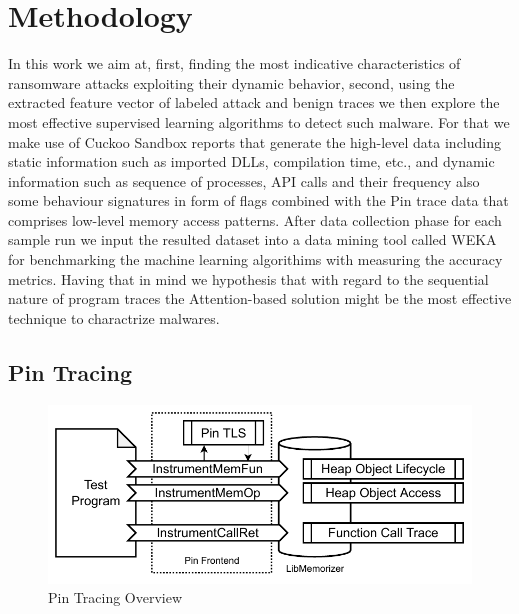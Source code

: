 \documentclass[letterpaper,twocolumn,10pt]{article}
\begin{document}
\section{Methodology}

In this work we aim at, first, finding the most indicative characteristics of ransomware attacks exploiting their dynamic behavior, second, using the extracted feature vector of labeled attack and benign traces we then explore the most effective supervised learning algorithms to detect such malware.
For that we make use of Cuckoo Sandbox reports that generate the high-level data including static information such as imported DLLs, compilation time, etc., and dynamic information such as sequence of processes, API calls and their frequency also some behaviour signatures in form of flags combined with the Pin trace data that comprises low-level memory access patterns. After data collection phase for each sample run we input the resulted dataset into a data mining tool called WEKA~\cite{weka} for benchmarking the machine learning algorithims with measuring the accuracy metrics. 
Having that in mind we hypothesis that with regard to the sequential nature of program traces the Attention-based solution might be the most effective technique to charactrize malwares.



\subsection{Pin Tracing}

\begin{figure}
    \centering
    \includegraphics[width=\linewidth]{pin.pdf}
    \caption{Pin Tracing Overview}
    \label{fig:pin}
\end{figure}
\end{document}
